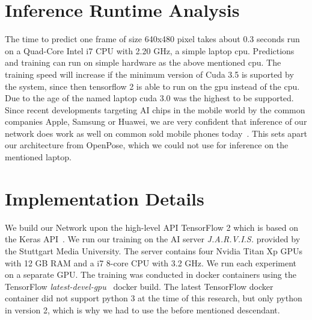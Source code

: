 \section{Inference Runtime Analysis}
The time to predict one frame of size 640x480 pixel takes about 0.3 seconds run on a Quad-Core Intel i7 CPU with 2.20 GHz,
a simple laptop cpu.
Predictions and training can run on simple hardware as the above mentioned cpu.
The training speed will increase if the minimum version of Cuda
3.5 is suported by the system, since then tensorflow 2 is able to run on the gpu instead of the cpu.
Due to the age of the named laptop cuda 3.0 was the highest to be supported.
Since recent developments targeting AI chips in the mobile world by the common companies Apple, Samsung or Huawei,
we are very confident that inference of our network does work as well on common sold mobile phones today~\cite{mobileAI}.
This sets apart our architecture from OpenPose, which we could not use for inference on the mentioned laptop.

\section{Implementation Details}
We build our Network upon the high-level API TensorFlow 2 which is based on the Keras API~\cite{tensorflow2}.
We run our training on the AI server \textit{J.A.R.V.I.S.} provided by the Stuttgart Media University.
The server contains four Nvidia Titan Xp GPUs with 12 GB RAM and a i7 8-core CPU with 3.2 GHz.
We run each experiment on a separate GPU. The training was conducted in docker containers using the TensorFlow
\textit{latest-devel-gpu}~\cite{tensorflowdocker} docker build.
The latest TensorFlow docker container did not support python 3 at the time of this research, but only python in version
2, which is why we had to use the before mentioned descendant.


